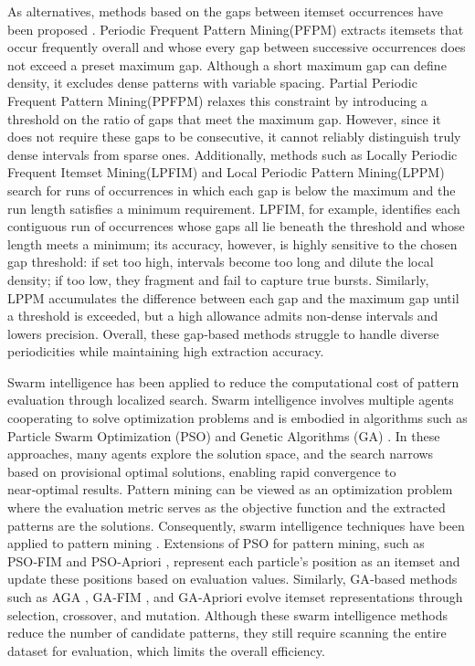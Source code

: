 As alternatives, methods based on the gaps between itemset occurrences have been proposed \cite{radhakrishna2015survey}. Periodic Frequent Pattern Mining(PFPM) \cite{tanbeer2009discovering} extracts itemsets that occur frequently overall and whose every gap between successive occurrences does not exceed a preset maximum gap. Although a short maximum gap can define density, it excludes dense patterns with variable spacing. Partial Periodic Frequent Pattern Mining(PPFPM) \cite{kiran2017discovering} relaxes this constraint by introducing a threshold on the ratio of gaps that meet the maximum gap. However, since it does not require these gaps to be consecutive, it cannot reliably distinguish truly dense intervals from sparse ones. Additionally, methods such as Locally Periodic Frequent Itemset Mining(LPFIM) \cite{mahanta2005finding} and Local Periodic Pattern Mining(LPPM) \cite{fournier2021mining} search for runs of occurrences in which each gap is below the maximum and the run length satisfies a minimum requirement. LPFIM, for example, identifies each contiguous run of occurrences whose gaps all lie beneath the threshold and whose length meets a minimum; its accuracy, however, is highly sensitive to the chosen gap threshold: if set too high, intervals become too long and dilute the local density; if too low, they fragment and fail to capture true bursts. Similarly, LPPM accumulates the difference between each gap and the maximum gap until a threshold is exceeded, but a high allowance admits non‑dense intervals and lowers precision. Overall, these gap‑based methods struggle to handle diverse periodicities while maintaining high extraction accuracy.

Swarm intelligence \cite{kennedy2006swarm} has been applied to reduce the computational cost of pattern evaluation through localized search. Swarm intelligence involves multiple agents cooperating to solve optimization problems and is embodied in algorithms such as Particle Swarm Optimization (PSO) \cite{kennedy1995particle} and Genetic Algorithms (GA) \cite{holland1975adaptation}. In these approaches, many agents explore the solution space, and the search narrows based on provisional optimal solutions, enabling rapid convergence to near‑optimal results. Pattern mining can be viewed as an optimization problem where the evaluation metric serves as the objective function and the extracted patterns are the solutions. Consequently, swarm intelligence techniques have been applied to pattern mining \cite{djenouri2018new}\cite{telikani2020survey}. Extensions of PSO for pattern mining, such as PSO‑FIM \cite{kuo2011application} and PSO‑Apriori \cite{djenouri2017combining}, represent each particle’s position as an itemset and update these positions based on evaluation values. Similarly, GA‑based methods such as AGA \cite{alatacs2006efficient}, GA‑FIM \cite{djenouri2014association}, and GA‑Apriori \cite{djenouri2017combining} evolve itemset representations through selection, crossover, and mutation. Although these swarm intelligence methods reduce the number of candidate patterns, they still require scanning the entire dataset for evaluation, which limits the overall efficiency.

